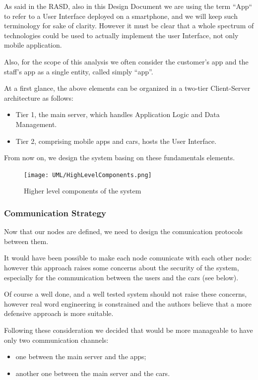 \documentclass[11pt]{article} %
\begin{document}
As said in the RASD, also in this Design Document we are using the term ``App`` to refer to a User Interface deployed on a smartphone, and we will keep such terminology for sake of clarity. However it must be clear that a whole spectrum of technologies could be used to actually implement the user Interface, not only mobile application.

Also, for the scope of this analysis we often consider the customer's app and the staff's app as a single entity, called simply ``app''.

At a first glance, the above elements can be organized in a two-tier Client-Server architecture as follows:
\begin{itemize}[noitemsep]
	\item Tier 1, the main server, which handles Application Logic and Data Management.
	\item Tier 2, comprising mobile apps and cars, hosts the User Interface.
\end{itemize}
From now on, we design the system basing on these fundamentals elements.

\begin{figure}[H]
	\centering
	\texttt{[image: UML/HighLevelComponents.png]}
	\caption{Higher level components of the system}
\end{figure}	


\subsubsection{Communication Strategy}

Now that our nodes are defined, we need to design the comunication protocols between them.

It would have been possible to make each node comunicate with each other node: however this approach raises some concerns about the security of the system, especially for the communication between the users and the cars (see below). 

Of course a well done, and a well tested system should not raise these concerns, however real word engineering is constrained and the authors believe that a more defensive approach is more suitable.

Following these consideration we decided that would be more manageable to have only two communication channels:
\begin{itemize}[noitemsep]
	\item one between the main server and the apps;
	\item another one between the main server and the cars.
\end{itemize}
\end{document}

